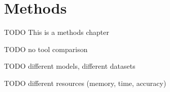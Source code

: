 \chapter{Methods}

TODO This is a methods chapter

TODO no tool comparison

TODO different models, different datasets

TODO different resources (memory, time, accuracy)